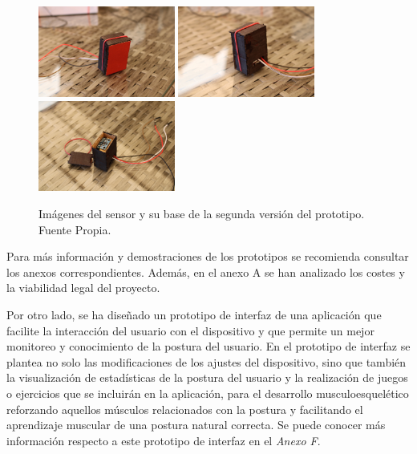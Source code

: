 \begin{figure}[h!]
    \centering
    \includegraphics[width=0.4\textwidth]{img/SensorV2_1.jpg}
    \includegraphics[width=0.4\textwidth]{img/SensorV2_2.jpg}
    \includegraphics[width=0.4\textwidth]{img/SensorV2_3.jpg}
    \caption{Imágenes del sensor y su base de la segunda versión del prototipo. Fuente Propia.}
    \label{fig:imgDispositivo_V2_sensor} 
\end{figure}

Para más información y demostraciones de los prototipos se recomienda consultar los anexos correspondientes. Además, en el anexo A se han analizado los costes y la viabilidad legal del proyecto.

Por otro lado, se ha diseñado un prototipo de interfaz de una aplicación que facilite la interacción del usuario con el dispositivo y que permite un mejor monitoreo y conocimiento de la postura del usuario. En el prototipo de interfaz se plantea no solo las modificaciones de los ajustes del dispositivo, sino que también la visualización de estadísticas de la postura del usuario y la realización de juegos o ejercicios que se incluirán en la aplicación, para el desarrollo musculoesquelético reforzando aquellos músculos relacionados con la postura y facilitando el aprendizaje muscular de una postura natural correcta. Se puede conocer más información respecto a este prototipo de interfaz en el \textit{Anexo F}.


